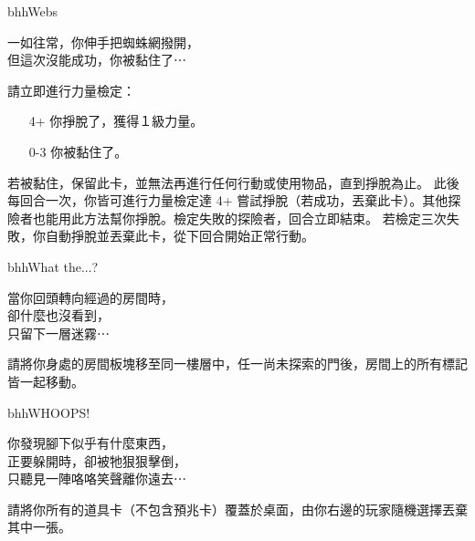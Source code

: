\linebreak[0]%
\begin{EventCard}{bhh}{Webs}
  \begin{CardStory}
    一如往常，你伸手把蜘蛛網撥開，\\
    但這次沒能成功，你被黏住了⋯
  \end{CardStory}
  請立即進行力量檢定：
  \begin{itemize}
    \item[4+] 你掙脫了，獲得１級力量。
    \item[0-3] 你被黏住了。
  \end{itemize}
  若被黏住，保留此卡，並無法再進行任何行動或使用物品，直到掙脫為止。\smallbreak
  此後每回合一次，你皆可進行力量檢定達 4+ 嘗試掙脫（若成功，丟棄此卡）。其他探險者也能用此方法幫你掙脫。檢定失敗的探險者，回合立即結束。\smallbreak
  若檢定三次失敗，你自動掙脫並丟棄此卡，從下回合開始正常行動。\smallbreak
\end{EventCard}%
\linebreak[0]%
\begin{EventCard}{bhh}{What the...?}
  \begin{CardStory}
    當你回頭轉向經過的房間時，\\
    卻什麼也沒看到，\\
    只留下一層迷霧⋯
  \end{CardStory}
 請將你身處的房間板塊移至同一樓層中，任一尚未探索的門後，房間上的所有標記皆一起移動。\smallbreak
\end{EventCard}%
\linebreak[0]%
\begin{EventCard}{bhh}{WHOOPS!}
  \begin{CardStory}
    你發現腳下似乎有什麼東西，\\
    正要躲開時，卻被牠狠狠擊倒，\\
    只聽見一陣咯咯笑聲離你遠去⋯
  \end{CardStory}
 請將你所有的道具卡（不包含預兆卡）覆蓋於桌面，由你右邊的玩家隨機選擇丟棄其中一張。\smallbreak
\end{EventCard}%
\linebreak[0]%
